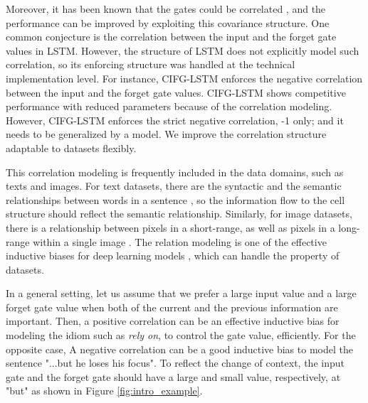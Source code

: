 \documentclass[letterpaper]{article} %
\begin{document}
Moreover, it has been known that the gates could be correlated \cite{greff2017lstm}, and the performance can be improved by exploiting this covariance structure. One common conjecture is the correlation between the input and the forget gate values in LSTM. However, the structure of LSTM does not explicitly model such correlation, so its enforcing structure was handled at the technical implementation level. For instance, CIFG-LSTM \cite{greff2017lstm} enforces the negative correlation between the input and the forget gate values. CIFG-LSTM shows competitive performance with reduced parameters because of the correlation modeling. However, CIFG-LSTM enforces the strict negative correlation, -1 only; and it needs to be generalized by a model. We improve the correlation structure adaptable to datasets flexibly. %

This correlation modeling is frequently included in the data domains, such as texts and images. For text datasets, there are the syntactic and the semantic relationships between words in a sentence \cite{harabagiu2004incremental}, so the information flow to the cell structure should reflect the semantic relationship. Similarly, for image datasets, there is a relationship between pixels in a short-range, as well as pixels in a long-range within a single image \cite{kampffmeyer2019connnet}. The relation modeling is one of the effective inductive biases for deep learning models \cite{battaglia2018relational}, which can handle the property of datasets.

In a general setting, let us assume that we prefer a large input value and a large forget gate value when both of the current and the previous information are important. Then, a positive correlation can be an effective inductive bias for modeling the idiom such as \textit{rely on}, to control the gate value, efficiently.
For the opposite case,
A negative correlation can be a good inductive bias to model the sentence "...but he loses his focus". To reflect the change of context, the input gate and the forget gate should have a large and small value, respectively, at "but" as shown in Figure \ref{fig:intro_example}.
\end{document}
